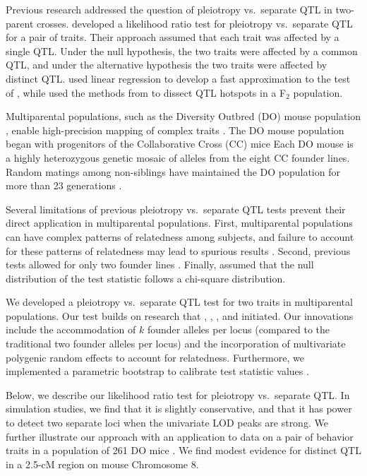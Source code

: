 \documentclass[oneside]{book}\usepackage[]{graphicx}\usepackage[]{color}
\begin{document}
Previous research addressed the question of pleiotropy vs.\ separate
QTL in two-parent crosses.
\citet{jiang1995multiple} developed a likelihood
ratio test for pleiotropy vs.\ separate QTL for a pair of traits.
Their approach assumed that each trait was affected by a single QTL.
Under the null hypothesis, the two traits were affected by a common
QTL, and under the alternative hypothesis the two traits were affected
by distinct QTL.
\citet{knott2000multitrait} used linear regression to develop a fast
approximation to the test of \citet{jiang1995multiple}, while
\citet{tian2016dissection} used the methods from
\citet{knott2000multitrait} to dissect QTL hotspots in a F$_2$
population.


Multiparental populations, such
as the Diversity Outbred (DO) mouse population \citep{churchill2012diversity}, enable high-precision
mapping of complex traits \citep{de2014genetics}. The DO
mouse population began with progenitors of the Collaborative
Cross (CC) mice \citep{churchill2004collaborative}
Each DO mouse is a highly heterozygous genetic mosaic
of alleles from the eight CC founder lines. Random
matings among non-siblings have maintained the DO
population for more than 23 generations \citep{chesler2016diversity}.

Several limitations of previous pleiotropy vs.\ separate QTL tests
prevent their direct application in multiparental populations. First,
multiparental populations can have complex patterns of relatedness
among subjects, and failure to account for these patterns of
relatedness may lead to spurious results \citep{yang2014advantages}.
Second, previous tests allowed for only two founder lines
\citep{jiang1995multiple}. Finally, \citet{jiang1995multiple} assumed
that the null distribution of the test statistic follows a chi-square
distribution.

We developed a pleiotropy vs.\ separate QTL test for two traits in
multiparental populations. Our test builds on research that
\citet{jiang1995multiple}, \citet{knott2000multitrait},
\citet{tian2016dissection}, and \citet{zhou2014efficient} initiated.
Our innovations include the accommodation of $k$ founder alleles per
locus (compared to the traditional two founder alleles per locus) and
the incorporation of multivariate polygenic random effects to account
for relatedness. Furthermore, we implemented a parametric bootstrap to
calibrate test statistic values \citep{efron1979,tian2016dissection}.

Below, we describe our likelihood ratio test for pleiotropy vs.\
separate QTL. In simulation studies, we find that it is slightly
conservative, and that it has power to detect two separate loci when
the univariate LOD peaks are strong. We further illustrate our
approach with an application to data on a pair of behavior traits in
a population of 261 DO mice \citep{logan2013high,recla2014precise}.
We find modest evidence for distinct QTL in a 2.5-cM region on mouse
Chromosome 8.
\end{document}
